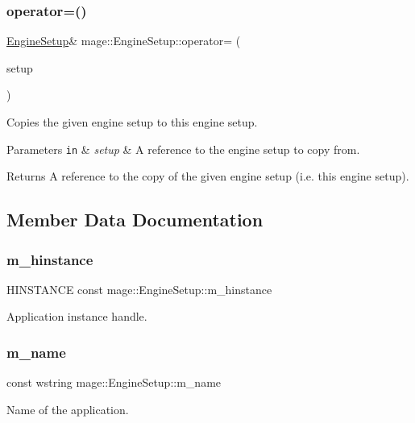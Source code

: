 \subsubsection{\texorpdfstring{operator=()}{operator=()}\hspace{0.1cm}{\footnotesize\ttfamily [2/2]}}
{\footnotesize\ttfamily \hyperlink{structmage_1_1_engine_setup}{Engine\+Setup}\& mage\+::\+Engine\+Setup\+::operator= (\begin{DoxyParamCaption}\item[{\hyperlink{structmage_1_1_engine_setup}{Engine\+Setup} \&\&}]{setup }\end{DoxyParamCaption})\hspace{0.3cm}{\ttfamily [delete]}}

Copies the given engine setup to this engine setup.


\begin{DoxyParams}[1]{Parameters}
\mbox{\tt in}  & {\em setup} & A reference to the engine setup to copy from. \\
\hline
\end{DoxyParams}
\begin{DoxyReturn}{Returns}
A reference to the copy of the given engine setup (i.\+e. this engine setup). 
\end{DoxyReturn}


\subsection{Member Data Documentation}
\hypertarget{structmage_1_1_engine_setup_a8d2dc7d0e8ec66629d8f6238a89bbb48}{}\label{structmage_1_1_engine_setup_a8d2dc7d0e8ec66629d8f6238a89bbb48} 
\subsubsection{\texorpdfstring{m\+\_\+hinstance}{m\_hinstance}}
{\footnotesize\ttfamily H\+I\+N\+S\+T\+A\+N\+CE const mage\+::\+Engine\+Setup\+::m\+\_\+hinstance\hspace{0.3cm}{\ttfamily [private]}}

Application instance handle. \hypertarget{structmage_1_1_engine_setup_a40fba981d4b1c30eff304b029a013009}{}\label{structmage_1_1_engine_setup_a40fba981d4b1c30eff304b029a013009} 
\subsubsection{\texorpdfstring{m\+\_\+name}{m\_name}}
{\footnotesize\ttfamily const wstring mage\+::\+Engine\+Setup\+::m\+\_\+name\hspace{0.3cm}{\ttfamily [private]}}

Name of the application. 